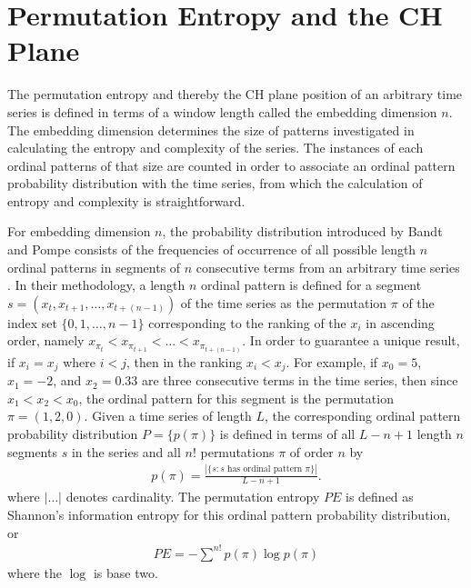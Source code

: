 \documentclass[aps,pre,twocolumn,secnumarabic,nobalancelastpage,amsmath,amssymb,
nofootinbib]{revtex4-1}
\begin{document}

\section{Permutation Entropy and the CH Plane}
The permutation entropy and thereby the CH plane position of an arbitrary time series is defined in terms of a window length called the embedding dimension $n$. The embedding dimension determines the size of patterns investigated in calculating the entropy and complexity of the series. The instances of each ordinal patterns of that size are counted in order to associate an ordinal pattern probability distribution with the time series, from which the calculation of entropy and complexity is straightforward.

For embedding dimension $n$, the probability distribution introduced by Bandt and Pompe consists of the frequencies of occurrence of all possible length $n$ ordinal patterns in segments of $n$ consecutive terms from an arbitrary time series \cite{bandt2002}. In their methodology, a length $n$ ordinal pattern is defined for a segment $s = ( x_t,x_{t+1},\ldots,x_{t+(n-1)} )$ of the time series as the permutation $\pi$ of the index set $\{0,1,\ldots,n-1 \}$ corresponding to the ranking of the $x_i$ in ascending order, namely $x_{\pi_t}< x_{\pi_{t+1}}<\ldots< x_{\pi_{t+(n-1)}}$. In order to guarantee a unique result, if $x_i = x_j$ where $i<j$, then in the ranking $x_i <x_j$. For example, if $x_0 = 5$,  $x_1= -2$,  and $x_2 = 0.33$ are three consecutive terms in the time series, then since $x_1 < x_2 < x_0$, the ordinal pattern for this segment is the permutation $\pi = (1,2,0)$.  Given a time series of length $L$, the corresponding ordinal pattern probability distribution $P= \{p(\pi) \}$ is defined in terms of all $L-n+1$ length $n$ segments $s$ in the series and all $n!$ permutations $\pi$ of order $n$ by
\begin{align}
p(\pi) = \frac{|\{s: \text{$s$ has ordinal pattern $\pi$}\}| }{L-n+1}. 
\end{align}
where $|\ldots|$ denotes cardinality. The permutation entropy $PE$ is defined as Shannon's information entropy for this ordinal pattern probability distribution, or
\begin{align}
PE  = -\sum^{n!} p(\pi) \log p(\pi)
\end{align}
where the $\log$ is base two.
\end{document}
